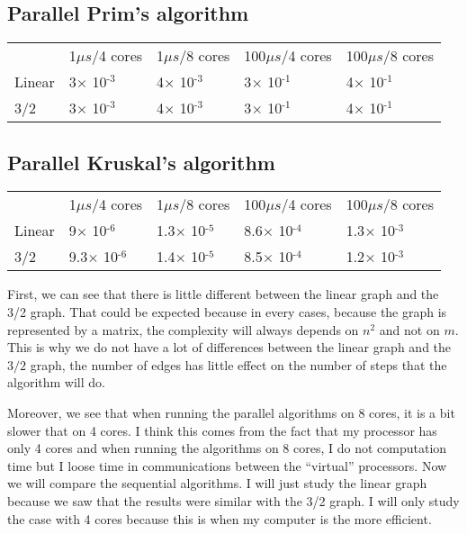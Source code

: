 \documentclass[
10pt, %
a4paper, %
oneside, %
headinclude,footinclude, %
BCOR5mm, %
]{scrartcl}
\begin{document}
\subsection{Parallel Prim's algorithm}
\begin{center}
  \begin{tabular}{lllll}
    & 1$\mu s$/4 cores & 1$\mu s$/8 cores & 100$\mu s$/4 cores & 100$\mu s$/8 cores\\
    Linear & 3$\times$ 10\(^{\text{-3}}\) & 4$\times$ 10\(^{\text{-3}}\) & 3$\times$ 10\(^{\text{-1}}\) & 4$\times$ 10\(^{\text{-1}}\)\\
    3/2 & 3$\times$ 10\(^{\text{-3}}\) & 4$\times$ 10\(^{\text{-3}}\) & 3$\times$ 10\(^{\text{-1}}\) & 4$\times$ 10\(^{\text{-1}}\)\\
  \end{tabular}
\end{center}

\subsection{Parallel Kruskal's algorithm}
\begin{center}
  \begin{tabular}{lllll}
    & 1$\mu s$/4 cores & 1$\mu s$/8 cores & 100$\mu s$/4 cores & 100$\mu s$/8 cores\\
    Linear & 9$\times$ 10\(^{\text{-6}}\) & 1.3$\times$ 10\(^{\text{-5}}\) & 8.6$\times$ 10\(^{\text{-4}}\) & 1.3$\times$ 10\(^{\text{-3}}\)\\
    3/2 & 9.3$\times$ 10\(^{\text{-6}}\) & 1.4$\times$ 10\(^{\text{-5}}\) & 8.5$\times$ 10\(^{\text{-4}}\) & 1.2$\times$ 10\(^{\text{-3}}\)\\
  \end{tabular}
\end{center}

First, we can see that there is little different between the linear
graph and the 3/2 graph. That could be expected because in every
cases, because the graph is represented by a matrix, the complexity
will always depends on $n^2$ and not on $m$. This is why we do not
have a lot of differences between the linear graph and the $3/2$
graph, the number of edges has little effect on the number of steps
that the algorithm will do.

Moreover, we see that when running the parallel algorithms on 8 cores,
it is a bit slower that on 4 cores. I think this comes from the fact
that my processor has only 4 cores and when running the algorithms on
8 cores, I do not computation time but I loose time in communications
between the ``virtual'' processors. Now we will compare the sequential
algorithms. I will just study the linear graph because we saw that the
results were similar with the 3/2 graph. I will only study the case
with 4 cores because this is when my computer is the more efficient.
\end{document}

